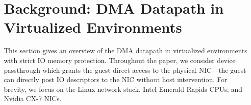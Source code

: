 \section{Background: DMA Datapath in Virtualized Environments}
\label{sec:background-datapath}
This section gives an overview of the DMA datapath 
    in virtualized environments with strict IO memory protection.
%
%
Throughout the paper, we consider device passthrough which grants the guest direct access 
    to the physical NIC---the guest can directly post IO descriptors to the NIC without host intervention. 
For brevity, we focus on the Linux network stack, Intel Emerald Rapids CPUs, and Nvidia CX-7 NICs. 


